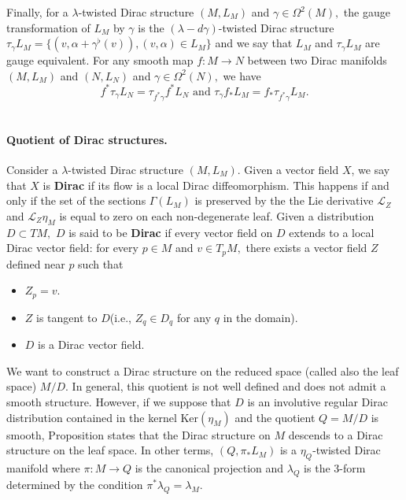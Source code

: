 \documentclass[reqno]{amsart}
\theoremstyle{plain}
\theoremstyle{definition}
\newcommand{\too}{\longrightarrow}
\renewcommand{\L}{\mathcal{L}}
\begin{document}
Finally, for a $\lambda$-twisted Dirac structure $(M,L_M)$ and $\gamma \in \Omega^{2}(M),$ the gauge transformation of $L_M$ by $\gamma$ is the $(\lambda - d\gamma)$-twisted Dirac structure $\tau_{\gamma}L_M = \{(v,\alpha + \gamma^{\flat}(v)), (v,\alpha) \in L_{M}\}$ and we say that $L_{M}$ and $\tau_{\gamma}L_M$ are gauge equivalent. For any smooth map $f: M\too N$ between two Dirac manifolds $(M,L_M)$ and $(N,L_N)$ and $\gamma \in \Omega^{2}(N),$ we have \cite{bualibanu2026reduction} \begin{equation}
    f^{*}\tau_{\gamma}L_{N} = \tau_{f^{*}\gamma}f^{*}L_{N} \text{ and } \tau_{\gamma}f_{*}L_M = f_{*}\tau_{f^{*}\gamma}L_M.
\end{equation}
\\


\paragraph{\textbf{Quotient of Dirac structures.}}
Consider a $\lambda$-twisted Dirac structure $(M,L_M).$ Given a vector field $X$, we say that $X$ is \textbf{Dirac} if its flow is a local Dirac diffeomorphism. This happens if and only if the set of the sections $\Gamma(L_M)$ is preserved by the the Lie derivative $\L_{Z}$ and $\L_{Z}\eta_M$ is equal to zero on each non-degenerate leaf. Given a distribution $D\subset TM,$ $D$ is said to be \textbf{Dirac} if every vector field on $D$ extends to a local Dirac vector field: for every $p\in M$ and $v\in T_{p}M,$ there exists a vector field $Z$ defined near $p$ such that \begin{itemize}
    \item $Z_p = v.$
    \item $Z$ is tangent to $D$(i.e., $Z_q \in D_q$ for any $q$ in the domain).
    \item $D$ is a Dirac vector field.
\end{itemize}

We want to construct  a Dirac structure on the reduced space (called also the leaf space) $M/D.$ In general, this quotient is not well defined and does not admit a smooth structure. However, if we suppose that $D$ is an involutive regular Dirac distribution contained in the kernel $\text{Ker}(\eta_M)$ and the quotient $ Q = M/D$ is smooth, Proposition \cite[]{bualibanu2026reduction} states that the Dirac structure on $M$ descends to a Dirac structure on the leaf space. In other terms, $(Q,\pi_{*}L_{M})$ is a $\eta_{Q}$-twisted Dirac manifold where $\pi: M\too Q$ is the canonical projection and $\lambda_{Q}$ is the 3-form determined by the condition $\pi^{*}\lambda_Q = \lambda_M.$ 
\end{document}
